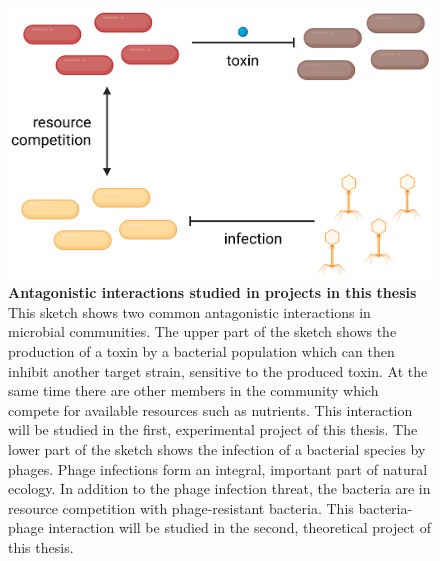 \begin{figure}
\includegraphics[width=\linewidth]{graphics/2025_09_30_intro_fig1.png}
\caption{\textbf{Antagonistic interactions studied in projects in this thesis} This sketch shows two common antagonistic interactions in microbial communities. The upper part of the sketch shows the production of a toxin by a bacterial population which can then inhibit another target strain, sensitive to the produced toxin. At the same time there are other members in the community which compete for available resources such as nutrients. This interaction will be studied in the first, experimental project of this thesis. The lower part of the sketch shows the infection of a bacterial species by phages. Phage infections form an integral, important part of natural ecology. In addition to the phage infection threat, the bacteria are in resource competition with phage-resistant bacteria. This bacteria-phage interaction will be studied in the second, theoretical project of this thesis.}
\label{fig:intro_shared_interactions}
\end{figure}